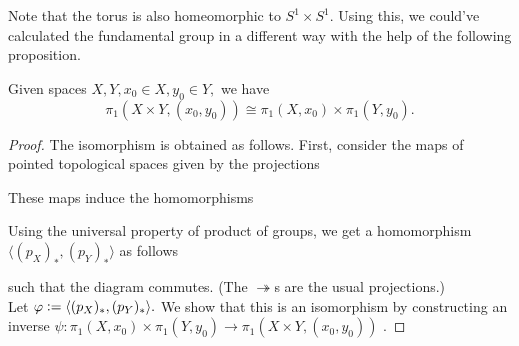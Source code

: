 \documentclass[12pt]{article}
\begin{document}
Note that the torus is also homeomorphic to $S^1 \times S^1.$ Using this, we could've calculated the fundamental group in a different way with the help of the following proposition.
\begin{prop}
	Given spaces $X, Y, x_0 \in X, y_0 \in Y,$ we have
	\begin{equation*} 
		\pi_1(X \times Y, (x_0, y_0)) \cong \pi_1(X, x_0) \times \pi_1(Y, y_0).
	\end{equation*}
\end{prop}
\begin{proof} 
	The isomorphism is obtained as follows. First, consider the maps of pointed topological spaces given by the projections
	\begin{center}
	\end{center}
	These maps induce the homomorphisms
	\begin{center}
	\end{center}
	Using the universal property of product of groups, we get a homomorphism $\langle (p_X)_*, (p_Y)_*\rangle$ as follows
	\begin{center}
	\end{center}
	such that the diagram commutes. (The $\twoheadrightarrow$s are the usual projections.)\\
	Let $\varphi \vcentcolon= \langle (p_X)_*, (p_Y)_*\rangle.$ We show that this is an isomorphism by constructing an inverse $\psi:\pi_1(X, x_0) \times \pi_1(Y, y_0) \to \pi_1(X \times Y, (x_0, y_0))$ .


\end{proof}
\end{document}
